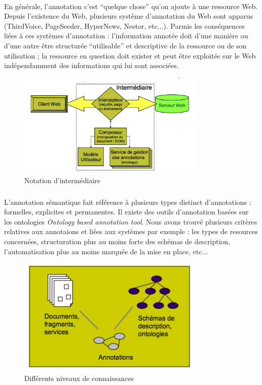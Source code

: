 \documentclass[12pt,a4	]{report}
\begin{document}
\paragraph{}
En générale, l'annotation c'est ``quelque chose'' qu'on ajoute à une ressource Web. Depuis l'existence du Web, plusieurs système d'annotation du Web sont apparus (ThirdVoice, PageSeeder, HyperNews, Nestor, etc...).
Parmis les conséquences liées à ces systèmes d'annotation : l'information annotée doit d'une manière ou d'une autre être structurée ``utilisable'' et descriptive de la ressource ou de son utilisation ; la ressource en question doit exister et peut être exploitée sur le Web indépendamment des informations qui lui sont associées.
\begin{figure}[H]
\centering
\includegraphics[width=9cm]{AnnotationSys.png}
\caption{Notation d'intermédiaire}
\end{figure}
\subparagraph{}
L'annotation sémantique fait référence à plusieurs types distinct d'annotations : formelles, explicites et permanentes. Il existe des outils d'annotation basées sur les ontologies {\it Ontology based annotation tool}.
Nous avons trouvé plusieurs critères relatives aux annotaions et liées aux systèmes par exemple : les types de resources concernées, structuration plus au moins forte des schémas de description, l'automatisation plus au moins marquée de la mise en place, etc...
\begin{figure}[H]
\centering
\includegraphics[width=9cm]{diffConnaissances.png}
\caption{Différents niveaux de connaissances}
\end{figure}
\end{document}
